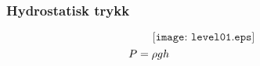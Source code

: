 \documentclass[aspectratio=169,xcolor=dvipsnames]{beamer}
\begin{document}
%
%
%
%
%
%
%
%
%
%
%
%
%
\begin{frame}
	\frametitle{Hydrostatisk trykk}

$$\texttt{[image: level01.eps]}$$
$$P = \rho g h \hskip 100pt $$
\end{frame}
%
%
%
%
%
%
%
%
%
%
%
%
%
%
\end{document}
